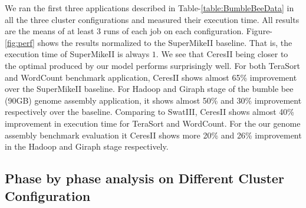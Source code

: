 \documentclass[journal]{IEEEtran}
\begin{document}
We ran the first three applications described in Table-\ref{table:BumbleBeeData} in all the three cluster configurations and measured their execution time. All results are the means of at least 3 runs of each job on each configuration. Figure-\ref{fig:perf} shows the results normalized to the SuperMikeII baseline. That is, the  execution time of SuperMikeII is always $1$. We see that CeresII being closer to the optimal produced by our model performs surprisingly well. For both TeraSort and WordCount benchmark application, CeresII shows almost 65\% improvement over the SuperMikeII baseline. For Hadoop and Giraph stage of the bumble bee (90GB) genome assembly application, it shows almost 50\%  and 30\% improvement respectively over the baseline. Comparing to SwatIII, CeresII shows almost 40\% improvement in execution time for TeraSort and WordCount. For the our genome assembly benchmark evaluation it CeresII shows more 20\% and 26\% improvement in the Hadoop and Giraph stage respectively. 

\subsection{Phase by phase analysis on Different Cluster Configuration}
%
%

\end{document}
